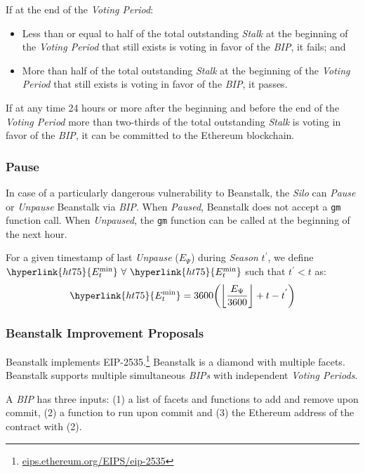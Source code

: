 \documentclass[tikz]{article}
\newcommand{\code}[1]{\texttt{#1}}
\newcommand{\term}[1]{\textsl{#1}}
\newcommand{\fref}[1]{\footnote{\href{http://#1}{#1}}}
\begin{document}
\vspace*{2mm}
If at the end of the \term{Voting Period}:
\begin{itemize}[midsep]
    \item Less than or equal to half of the total outstanding \term{Stalk} at the beginning of the \term{Voting Period} that still exists is voting in favor of the \term{BIP}, it fails; and
    \item More than half of the total outstanding \term{Stalk} at the beginning of the \term{Voting Period} that still exists is voting in favor of the \term{BIP}, it passes.
\end{itemize}

If at any time 24 hours or more after the beginning and before the end of the \term{Voting Period} more than two-thirds of the total outstanding \term{Stalk} is voting in favor of the \term{BIP}, it can be committed to the Ethereum blockchain.

\subsubsection{Pause}
In case of a particularly dangerous vulnerability to Beanstalk, the \term{Silo} can \term{Pause} or \term{Unpause} Beanstalk via \term{BIP}. When \term{Paused}, Beanstalk does not accept a \code{gm} function call. When \term{Unpaused}, the \code{gm} function can be called at the beginning of the next hour.

For a given timestamp of last \term{Unpause} (\hyperlink{ht78}{$E_{\Psi}$}) during \term{Season} $t^{'}$, we define $\hyperlink{ht75}{E_{t}^{\text{min}}}\ \forall\ \hyperlink{ht75}{E_{t}^{\text{min}}}$ such that $t^{'} < t$ as:
$$\hyperlink{ht75}{E_{t}^{\text{min}}} = 3600{\left({\left\lfloor\frac{E_{\Psi}}{3600}\right\rfloor} + t - t^{'}\right)}$$

\subsubsection{Beanstalk Improvement Proposals}
Beanstalk implements EIP-2535.\fref{eips.ethereum.org/EIPS/eip-2535} Beanstalk is a diamond with multiple facets. Beanstalk supports multiple simultaneous \term{BIPs} with independent \term{Voting Periods}.

A \term{BIP} has three inputs: (1) a list of facets and functions to add and remove upon commit, (2) a function to run upon commit and (3) the Ethereum address of the contract with (2).
\end{document}
